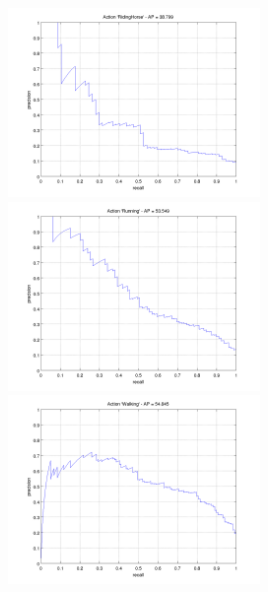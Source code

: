 \documentclass[10pt,a4paper]{llncs}
\begin{document}
\begin{figure}
\begin{minipage}{0.5\linewidth}
\end{minipage}
\begin{minipage}{0.5\linewidth}
\includegraphics[height=5cm]{img/LSVM_PR_RidingHorse.png}
\end{minipage}
\begin{minipage}{0.5\linewidth}
\includegraphics[height=5cm]{img/LSVM_PR_Running.png}
\end{minipage}
\begin{minipage}{0.5\linewidth}
\includegraphics[height=5cm]{img/LSVM_PR_Walking.png}
\end{minipage}
\end{figure}

%
%
\end{document}
